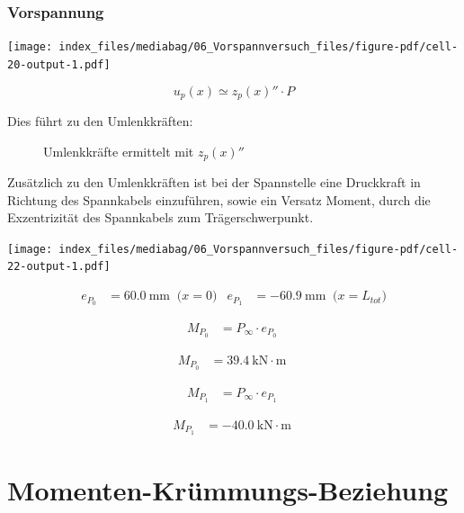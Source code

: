 \documentclass[
  11pt,
  letterpaper,
]{scrreprt}
\begin{document}
\subsubsection{Vorspannung}\label{vorspannung-1}

\texttt{[image: index\_files/mediabag/06\_Vorspannversuch\_files/figure-pdf/cell-20-output-1.pdf]}

\[
u_p(x) \simeq z_p(x)'' \cdot P
\]

Dies führt zu den Umlenkkräften:

\begin{figure}[H]


\caption{\label{fig-u_p_von_x}Umlenkkräfte ermittelt mit \(z_p(x)''\)}

\end{figure}%

Zusätzlich zu den Umlenkkräften ist bei der Spannstelle eine Druckkraft
in Richtung des Spannkabels einzuführen, sowie ein Versatz Moment, durch
die Exzentrizität des Spannkabels zum Trägerschwerpunkt.

\texttt{[image: index\_files/mediabag/06\_Vorspannversuch\_files/figure-pdf/cell-22-output-1.pdf]}

$$
\begin{aligned}
e_{P_{0}} &= 60.0\ \mathrm{mm} \; \;\textrm{($x=0$)}
 &e_{P_{1}} &= -60.9\ \mathrm{mm} \; \;\textrm{($x=L_{tot}$)}
\end{aligned}
$$

$$
\begin{aligned}
M_{P_{0}} &= P_{\infty} \cdot e_{P_{0}} \; 
\end{aligned}
$$

$$
\begin{aligned}
M_{P_{0}} &= 39.4\ \mathrm{kN} \cdot \mathrm{m} \;
\end{aligned}
$$

$$
\begin{aligned}
M_{P_{1}} &= P_{\infty} \cdot e_{P_{1}} \; 
\end{aligned}
$$

$$
\begin{aligned}
M_{P_{1}} &= -40.0\ \mathrm{kN} \cdot \mathrm{m} \;
\end{aligned}
$$

\section{Momenten-Krümmungs-Beziehung}\label{momenten-kruxfcmmungs-beziehung}
\end{document}

